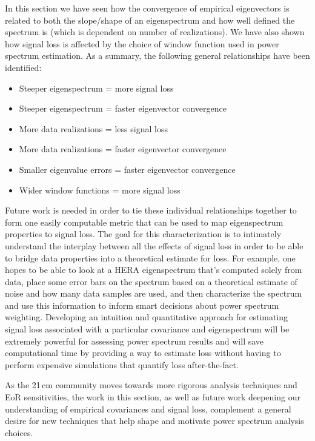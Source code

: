 In this section we have seen how the convergence of empirical eigenvectors is related to both the slope/shape of an eigenspectrum and how well defined the spectrum is (which is dependent on number of realizations). We have also shown how signal loss is affected by the choice of window function used in power spectrum estimation. As a summary, the following general relationships have been identified:

\begin{itemize}
\item Steeper eigenspectrum = more signal loss
\item Steeper eigenspectrum = faster eigenvector convergence
\item More data realizations = less signal loss
\item More data realizations = faster eigenvector convergence
\item Smaller eigenvalue errors = faster eigenvector convergence
\item Wider window functions = more signal loss
\end{itemize}

Future work is needed in order to tie these individual relationships together to form one easily computable metric that can be used to map eigenspectrum properties to signal loss. The goal for this characterization is to intimately understand the interplay between all the effects of signal loss in order to be able to bridge data properties into a theoretical estimate for loss. For example, one hopes to be able to look at a HERA eigenspectrum that's computed solely from data, place some error bars on the spectrum based on a theoretical estimate of noise and how many data samples are used, and then characterize the spectrum and use this information to inform smart decisions about power spectrum weighting. Developing an intuition and quantitative approach for estimating signal loss associated with a particular covariance and eigenspectrum will be extremely powerful for assessing power spectrum results and will save computational time by providing a way to estimate loss without having to perform expensive simulations that quantify loss after-the-fact. 

As the 21\,cm community moves towards more rigorous analysis techniques and EoR sensitivities, the work in this section, as well as future work deepening our understanding of empirical covariances and signal loss, complement a general desire for new techniques that help shape and motivate power spectrum analysis choices.

